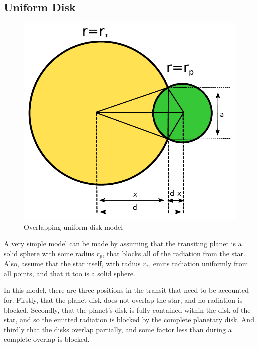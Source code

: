 \subsection{Uniform Disk}
\begin{figure}
    \centering
    \includegraphics[width=\figwidth]{images/uniform_disk_overlap.pdf}
    \caption{Overlapping uniform disk model}
    \label{fig:uniform_overlap}
\end{figure}

A very simple model can be made by assuming that the transiting planet is a solid sphere with some radius $r_p$, that blocks all of the radiation from the star. Also, assume that the star itself, with radius $r_*$, emits radiation uniformly from all points, and that it too is a solid sphere.

In this model, there are three positions in the transit that need to be accounted for. Firstly, that the planet disk does not overlap the star, and no radiation is blocked. Secondly, that the planet's disk is fully contained within the disk of the star, and so the emitted radiation is blocked by the complete planetary disk. And thirdly that the disks overlap partially, and some factor less than during a complete overlap is blocked.

